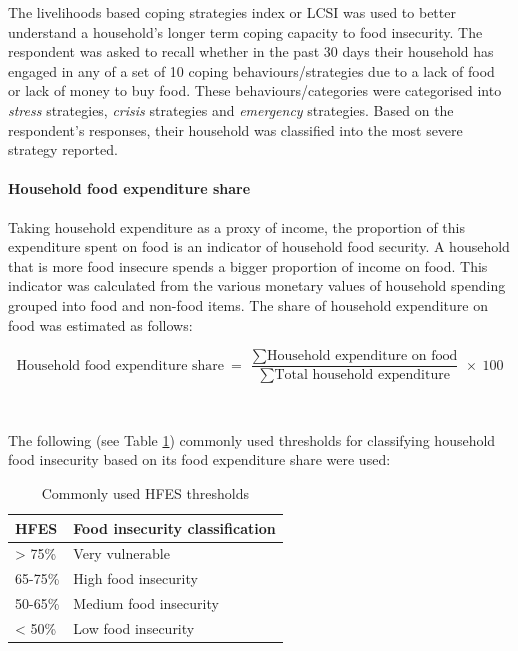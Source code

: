 \documentclass[12pt,a4paper]{article}
\let\oldparagraph\paragraph
\renewcommand{\paragraph}[1]{\oldparagraph{#1}\mbox{}}
\begin{document}
The livelihoods based coping strategies index or LCSI was used to better understand a household's longer term coping capacity to food insecurity. The respondent was asked to recall whether in the past 30 days their household has engaged in any of a set of 10 coping behaviours/strategies due to a lack of food or lack of money to buy food. These behaviours/categories were categorised into \emph{stress} strategies, \emph{crisis} strategies and \emph{emergency} strategies. Based on the respondent's responses, their household was classified into the most severe strategy reported.

\hypertarget{hfes}{%
\paragraph{Household food expenditure share}\label{hfes}}

Taking household expenditure as a proxy of income, the proportion of this expenditure spent on food is an indicator of household food security. A household that is more food insecure spends a bigger proportion of income on food. This indicator was calculated from the various monetary values of household spending grouped into food and non-food items. The share of household expenditure on food was estimated as follows:

\[ \text{Household food expenditure share} ~ = ~ \frac{\sum{\text{Household expenditure on food}}}{\sum{\text{Total household expenditure}}} ~ \times ~ 100 \]

~

The following (see Table \ref{tab:hfes1}) commonly used thresholds for classifying household food insecurity based on its food expenditure share were used:

\begin{table}[H]

\caption{\label{tab:hfes1}Commonly used HFES thresholds}
\centering
\begin{tabular}[t]{ll}
\toprule
HFES & Food insecurity classification\\
\midrule
\rowcolor{gray!6}  > 75\% & Very vulnerable\\
65-75\% & High food insecurity\\
\rowcolor{gray!6}  50-65\% & Medium food insecurity\\
< 50\% & Low food insecurity\\
\bottomrule
\end{tabular}
\end{table}
\end{document}
